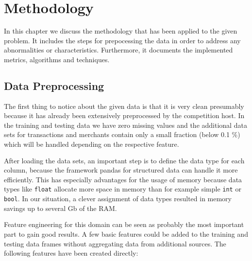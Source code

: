 \documentclass{article}
\begin{document}
\newpage
\section{Methodology}
In this chapter we discuss the methodology that has been applied to the given problem. It includes the steps for prepocessing the data in order to address any abnormalities or characteristics. Furthermore, it documents the implemented metrics, algorithms and techniques.

\subsection{Data Preprocessing}
\label{sec:data_preprocessing}


The first thing to notice about the given data is that it is very clean presumably because it has already been extensively preprocessed by the competition host. In the training and testing data we have zero missing values and the additional data sets for transactions and merchants contain only a small fraction (below 0.1 \%) which will be handled depending on the respective feature.

After loading the data sets, an important step is to define the data type for each column, because the framework pandas for structured data can handle it more efficiently. This has especially advantages for the usage of memory because data types like \texttt{float} allocate more space in memory than for example simple \texttt{int} or \texttt{bool}. In our situation, a clever assignment of data types resulted in memory savings up to several Gb of the RAM.

Feature engineering for this domain can be seen as probably the most important part to gain good results. A few basic features could be added to the training and testing data frames without aggregating data from additional sources. The following features have been created directly:
\end{document}
